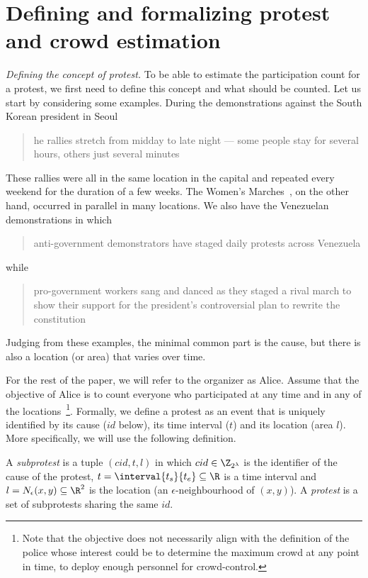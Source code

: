 \section{Defining and formalizing protest and crowd estimation}%
\label{SystemModel}


\emph{Defining the concept of protest.} To be able to estimate the participation count for a protest, we first need to define this concept and what should be counted.
Let us start by considering some examples.
During the demonstrations against the South Korean president in Seoul
\blockcquote{2016DemonstrationsInSeoul}{%
  he rallies stretch from midday to late night --- some people stay for several hours, others just several minutes%
}.
These rallies were all in the same location in the capital and repeated every 
weekend for the duration of a few weeks.
The Women's Marches~\cite{2017WomensMarchesInUS}, on the other hand, occurred in parallel in many locations.
We also have the Venezuelan demonstrations in which
\blockcquote{2017VenezuelaProtestFrequency}{%
  anti-government demonstrators have staged daily protests across Venezuela%
} while
\blockcquote{AlJazeeraOnVenezuela2017}{%
  pro-government workers sang and danced as they staged a rival march to show their support for the president's controversial plan to rewrite the constitution%
}.
Judging from these examples, the minimal common part is the cause,%
\label{CauseIsTheCommonDenominator} but there is also a location (or area) that varies over time.

For the rest of the paper, we will refer to the organizer as Alice.
Assume that the objective of Alice is to count everyone who participated at any time and in any of the locations~\cite{2016DemonstrationsInSeoul}\footnote{Note that the objective does not necessarily align with the definition of the police whose interest could be to determine the maximum crowd at any point in time, to deploy enough personnel for crowd-control.}.
Formally, we define a protest as an event that is uniquely identified by its cause (\(id\) below), its time interval (\(t\)) and its location (area \(l\)).
More specifically, we will use the following definition.

\begin{definition}[Protest]\label{DefProtest}
  A \emph{subprotest} is a tuple \((cid, t, l)\) in which \(cid\in \Z_{2^\lambda}\) is the identifier of the cause of the protest,
  \(t = \interval{t_s}{t_e}\subseteq \R\) is a time interval and \(l = N_\epsilon(x, y)\subseteq \R^2\) is the location (an \(\epsilon\)-neighbourhood of \((x,y)\)).
  A \emph{protest} is a set of subprotests sharing the same \(id\).
\end{definition}

